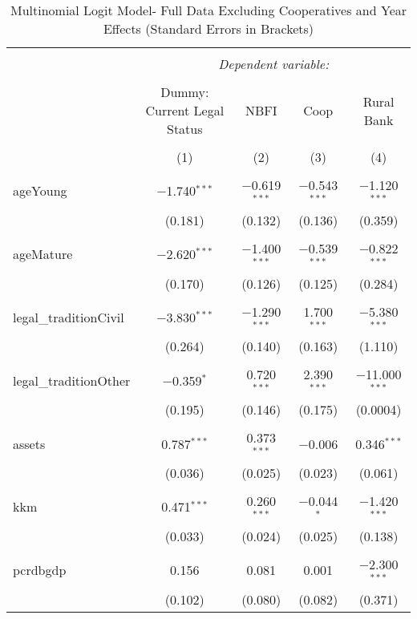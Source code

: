 \documentclass[a4paper,nobind]{templates/ociamthesis}
\begin{document}
\begin{table}[!htbp] \centering 
  \caption{Multinomial Logit Model- Full Data Excluding Cooperatives and Year Effects (Standard Errors in Brackets)} 
  \label{} 
\footnotesize 
\begin{tabular}{@{\extracolsep{5pt}}lcccc} 
\\[-1.8ex]\hline 
\hline \\[-1.8ex] 
 & \multicolumn{4}{c}{\textit{Dependent variable:}} \\ 
\cline{2-5} 
\\[-1.8ex] & Dummy: Current Legal Status & NBFI & Coop & Rural Bank \\ 
\\[-1.8ex] & (1) & (2) & (3) & (4)\\ 
\hline \\[-1.8ex] 
 ageYoung & $-$1.740$^{***}$ & $-$0.619$^{***}$ & $-$0.543$^{***}$ & $-$1.120$^{***}$ \\ 
  & (0.181) & (0.132) & (0.136) & (0.359) \\ 
  & & & & \\ 
 ageMature & $-$2.620$^{***}$ & $-$1.400$^{***}$ & $-$0.539$^{***}$ & $-$0.822$^{***}$ \\ 
  & (0.170) & (0.126) & (0.125) & (0.284) \\ 
  & & & & \\ 
 legal\_traditionCivil & $-$3.830$^{***}$ & $-$1.290$^{***}$ & 1.700$^{***}$ & $-$5.380$^{***}$ \\ 
  & (0.264) & (0.140) & (0.163) & (1.110) \\ 
  & & & & \\ 
 legal\_traditionOther & $-$0.359$^{*}$ & 0.720$^{***}$ & 2.390$^{***}$ & $-$11.000$^{***}$ \\ 
  & (0.195) & (0.146) & (0.175) & (0.0004) \\ 
  & & & & \\ 
 assets & 0.787$^{***}$ & 0.373$^{***}$ & $-$0.006 & 0.346$^{***}$ \\ 
  & (0.036) & (0.025) & (0.023) & (0.061) \\ 
  & & & & \\ 
 kkm & 0.471$^{***}$ & 0.260$^{***}$ & $-$0.044$^{*}$ & $-$1.420$^{***}$ \\ 
  & (0.033) & (0.024) & (0.025) & (0.138) \\ 
  & & & & \\ 
 pcrdbgdp & 0.156 & 0.081 & 0.001 & $-$2.300$^{***}$ \\ 
  & (0.102) & (0.080) & (0.082) & (0.371) \\ 

\end{tabular}
\end{table}
\end{document}
